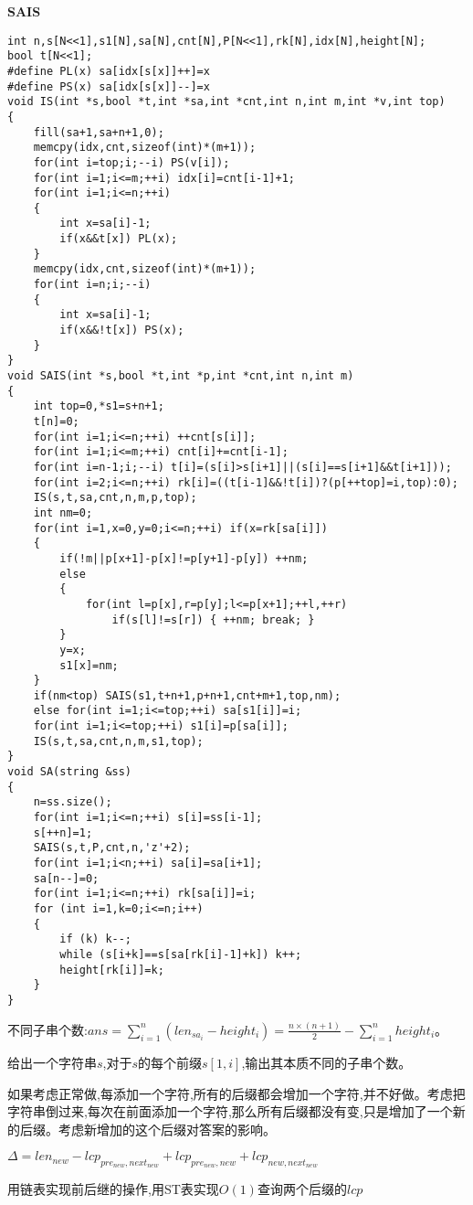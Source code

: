 \documentclass[a4paper]{ctexart}
\begin{document}
\textbf{SAIS}

\begin{lstlisting}
int n,s[N<<1],s1[N],sa[N],cnt[N],P[N<<1],rk[N],idx[N],height[N];
bool t[N<<1];
#define PL(x) sa[idx[s[x]]++]=x
#define PS(x) sa[idx[s[x]]--]=x
void IS(int *s,bool *t,int *sa,int *cnt,int n,int m,int *v,int top)
{
    fill(sa+1,sa+n+1,0);
    memcpy(idx,cnt,sizeof(int)*(m+1));
    for(int i=top;i;--i) PS(v[i]);
    for(int i=1;i<=m;++i) idx[i]=cnt[i-1]+1;
    for(int i=1;i<=n;++i)
    {
        int x=sa[i]-1;
        if(x&&t[x]) PL(x);
    }
    memcpy(idx,cnt,sizeof(int)*(m+1));
    for(int i=n;i;--i)
    {
        int x=sa[i]-1;
        if(x&&!t[x]) PS(x);
    }
}
void SAIS(int *s,bool *t,int *p,int *cnt,int n,int m)
{
    int top=0,*s1=s+n+1;
    t[n]=0;
    for(int i=1;i<=n;++i) ++cnt[s[i]];
    for(int i=1;i<=m;++i) cnt[i]+=cnt[i-1];
    for(int i=n-1;i;--i) t[i]=(s[i]>s[i+1]||(s[i]==s[i+1]&&t[i+1]));
    for(int i=2;i<=n;++i) rk[i]=((t[i-1]&&!t[i])?(p[++top]=i,top):0);
    IS(s,t,sa,cnt,n,m,p,top);
    int nm=0;
    for(int i=1,x=0,y=0;i<=n;++i) if(x=rk[sa[i]])
    {
        if(!m||p[x+1]-p[x]!=p[y+1]-p[y]) ++nm;
        else
        {
            for(int l=p[x],r=p[y];l<=p[x+1];++l,++r)
                if(s[l]!=s[r]) { ++nm; break; }
        }
        y=x;
        s1[x]=nm;
    }
    if(nm<top) SAIS(s1,t+n+1,p+n+1,cnt+m+1,top,nm);
    else for(int i=1;i<=top;++i) sa[s1[i]]=i;
    for(int i=1;i<=top;++i) s1[i]=p[sa[i]];
    IS(s,t,sa,cnt,n,m,s1,top);
}
void SA(string &ss)
{
    n=ss.size();
    for(int i=1;i<=n;++i) s[i]=ss[i-1];
    s[++n]=1;
    SAIS(s,t,P,cnt,n,'z'+2);
    for(int i=1;i<n;++i) sa[i]=sa[i+1];
    sa[n--]=0;
    for(int i=1;i<=n;++i) rk[sa[i]]=i;
    for (int i=1,k=0;i<=n;i++)
    {
        if (k) k--;
        while (s[i+k]==s[sa[rk[i]-1]+k]) k++;
        height[rk[i]]=k;
    }
}
\end{lstlisting}

不同子串个数:$ans=\sum\limits_{i=1}^n{(len_{sa_i}-height_i)}=\frac{n\times (n+1)}{2}-\sum\limits_{i=1}^n height_i$。

给出一个字符串$s$,对于$s的每个前缀s[1,i]$,输出其本质不同的子串个数。

如果考虑正常做,每添加一个字符,所有的后缀都会增加一个字符,并不好做。考虑把字符串倒过来,每次在前面添加一个字符,那么所有后缀都没有变,只是增加了一个新的后缀。考虑新增加的这个后缀对答案的影响。

$\Delta=len_{new}-lcp_{pre_{new},next_{new}}+lcp_{pre_{new},new}+lcp_{new,next_{new}}$ 

用链表实现前后继的操作,用ST表实现$O(1)$查询两个后缀的$lcp$
\end{document}
